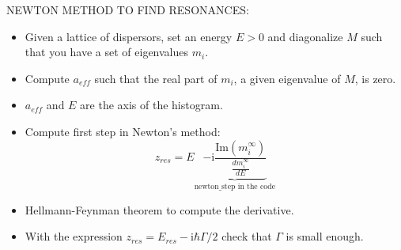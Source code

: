 NEWTON METHOD TO FIND RESONANCES:

\begin{itemize}
    \item Given a lattice of dispersors, set an energy $E>0$ and diagonalize $M$ such that you have a set of eigenvalues $m_i$.
    \item Compute $a_{eff}$ such that the real part of $m_i$, a given eigenvalue of $M$, is zero.
    \item $a_{eff}$ and $E$ are the axis of the histogram.
    \item Compute first step in Newton's method:
    \begin{equation}
        z_{res}=E \underbrace{-\text{i}\frac{\text{Im}(m^{\infty}_i)}{\frac{d m_i^{\infty}}{dE}}}_{\text{newton\_step in the code}}
    \end{equation}
    \item Hellmann-Feynman theorem to compute the derivative.
    \item With the expression $z_{res}=E_{res}-\text{i}\hbar \Gamma/2$ check that $\Gamma$ is small enough.
\end{itemize}
